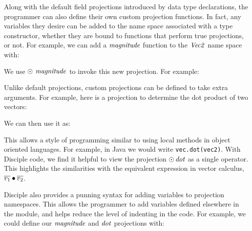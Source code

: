 Along with the default field projections introduced by data type declarations, the programmer can also define their own custom projection functions. In fact, any variables they desire can be added to the name space associated with a type constructor, whether they are bound to functions that perform true projections, or not. For example, we can add a $\operatorname{\mathit{magnitude}}$ function to the $\operatorname{\mathit{Vec2}}$ name space with:


We use $\odot \: \operatorname{\mathit{magnitude}}$ to invoke this new projection. For example:


Unlike default projections, custom projections can be defined to take extra arguments. For example, here is a projection to determine the dot product of two vectors:


We can then use it as:


This allows a style of programming similar to using local methods in object oriented languages. For example, in Java we would write \texttt{vec.dot(vec2)}. With Disciple code, we find it helpful to view the projection $\odot \operatorname{\mathit{dot}}$ as a single operator. This highlights the similarities with the equivalent expression in vector calculus, $\overline{v_1} \bullet \overline{v_2}$.

Disciple also provides a punning syntax for adding variables to projection namespaces. This allows the programmer to add variables defined elsewhere in the module, and helps reduce the level of indenting in the code. For example, we could define our $\operatorname{\mathit{magnitude}}$ and $\operatorname{\mathit{dot}}$ projections with:

